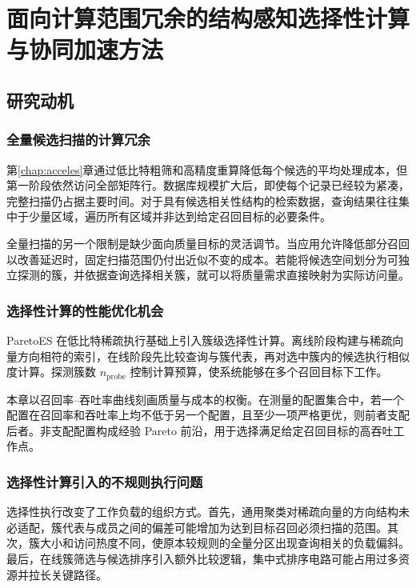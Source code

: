 \chapter{面向计算范围冗余的结构感知选择性计算与协同加速方法}\label{chap:paretoes}
\section{研究动机}
\subsection{全量候选扫描的计算冗余}
第\ref{chap:acceles}章通过低比特粗筛和高精度重算降低每个候选的平均处理成本，但第一阶段依然访问全部矩阵行。数据库规模扩大后，即使每个记录已经较为紧凑，完整扫描仍占据主要时间。对于具有候选相关性结构的检索数据，查询结果往往集中于少量区域，遍历所有区域并非达到给定召回目标的必要条件。

全量扫描的另一个限制是缺少面向质量目标的灵活调节。当应用允许降低部分召回以改善延迟时，固定扫描范围仍付出近似不变的成本。若能将候选空间划分为可独立探测的簇，并依据查询选择相关簇，就可以将质量需求直接映射为实际访问量。

\subsection{选择性计算的性能优化机会}
ParetoES 在低比特稀疏执行基础上引入簇级选择性计算\cite{paretoes2026}。离线阶段构建与稀疏向量方向相符的索引，在线阶段先比较查询与簇代表，再对选中簇内的候选执行相似度计算。探测簇数 $n_{\mathrm{probe}}$ 控制计算预算，使系统能够在多个召回目标下工作。

本章以召回率--吞吐率曲线刻画质量与成本的权衡。在测量的配置集合中，若一个配置在召回率和吞吐率上均不低于另一个配置，且至少一项严格更优，则前者支配后者。非支配配置构成经验 Pareto 前沿，用于选择满足给定召回目标的高吞吐工作点。

\subsection{选择性计算引入的不规则执行问题}
选择性执行改变了工作负载的组织方式。首先，通用聚类对稀疏向量的方向结构未必适配，簇代表与成员之间的偏差可能增加为达到目标召回必须扫描的范围。其次，簇大小和访问热度不同，使原本较规则的全量分区出现查询相关的负载偏斜。最后，在线簇筛选与候选排序引入额外比较逻辑，集中式排序电路可能占用过多资源并拉长关键路径。


